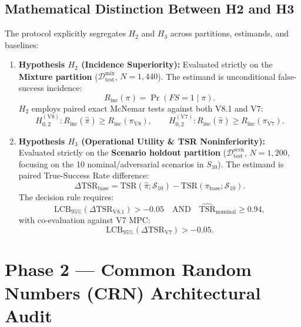 \documentclass[10pt,a4paper]{article}
\begin{document}
\subsection{Mathematical Distinction Between H2 and H3}
The protocol explicitly segregates $H_2$ and $H_3$ across partitions, estimands, and baselines:
\begin{enumerate}
    \item \textbf{Hypothesis $H_2$ (Incidence Superiority):}
    Evaluated strictly on the \textbf{Mixture partition} ($\mathcal{D}_{\text{test}}^{\text{mix}}$, $N=1,440$). The estimand is unconditional false-success incidence:
    \begin{equation}
        R_{\mathrm{inc}}(\pi) = \Pr(FS = 1 \mid \pi).
    \end{equation}
    $H_2$ employs paired exact McNemar tests against both V8.1 and V7:
    \begin{equation}
        H_{0,2}^{(\mathrm{V8})}: R_{\mathrm{inc}}(\hat{\pi}) \ge R_{\mathrm{inc}}(\pi_{\mathrm{V8}}), \qquad
        H_{0,2}^{(\mathrm{V7})}: R_{\mathrm{inc}}(\hat{\pi}) \ge R_{\mathrm{inc}}(\pi_{\mathrm{V7}}).
    \end{equation}
    \item \textbf{Hypothesis $H_3$ (Operational Utility \& TSR Noninferiority):}
    Evaluated strictly on the \textbf{Scenario holdout partition} ($\mathcal{D}_{\text{test}}^{\text{scen}}$, $N=1,200$, focusing on the 10 nominal/adversarial scenarios in $S_{10}$). The estimand is paired True-Success Rate difference:
    \begin{equation}
        \Delta\mathrm{TSR}_{\mathrm{base}} = \mathrm{TSR}(\hat{\pi}; \mathcal{S}_{10}) - \mathrm{TSR}(\pi_{\mathrm{base}}; \mathcal{S}_{10}).
    \end{equation}
    The decision rule requires:
    \begin{equation}
        \mathrm{LCB}_{95\%}(\Delta\mathrm{TSR}_{\mathrm{V8.1}}) > -0.05 \quad \text{AND} \quad \widehat{\mathrm{TSR}}_{\mathrm{nominal}} \ge 0.94,
    \end{equation}
    with co-evaluation against V7 MPC:
    \begin{equation}
        \mathrm{LCB}_{95\%}(\Delta\mathrm{TSR}_{\mathrm{V7}}) > -0.05.
    \end{equation}
\end{enumerate}

\section{Phase 2 — Common Random Numbers (CRN) Architectural Audit}
\end{document}

